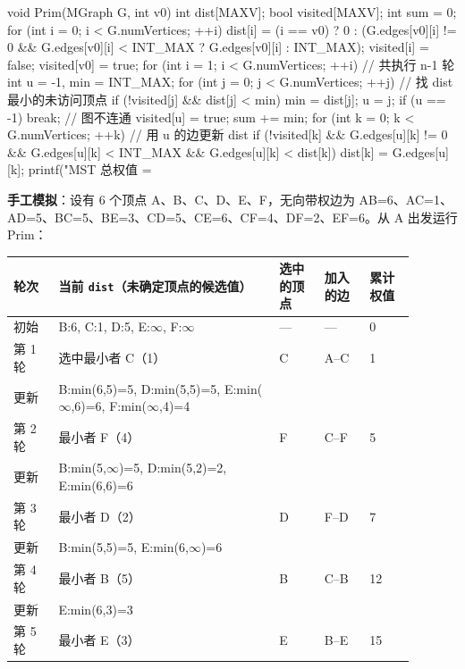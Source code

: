\documentclass[11pt,openany,UTF8]{ctexbook}
\begin{document}
\begin{codebox}
void Prim(MGraph G, int v0) {
    int dist[MAXV];
    bool visited[MAXV];
    int sum = 0;
    for (int i = 0; i < G.numVertices; ++i) {
        dist[i] = (i == v0) ? 0 :
                  (G.edges[v0][i] != 0 && G.edges[v0][i] < INT_MAX ? G.edges[v0][i] : INT_MAX);
        visited[i] = false;
    }
    visited[v0] = true;
    for (int i = 1; i < G.numVertices; ++i) {     // 共执行 n-1 轮
        int u = -1, min = INT_MAX;
        for (int j = 0; j < G.numVertices; ++j) { // 找 dist 最小的未访问顶点
            if (!visited[j] && dist[j] < min) { min = dist[j]; u = j; }
        }
        if (u == -1) break;                       // 图不连通
        visited[u] = true;
        sum += min;
        for (int k = 0; k < G.numVertices; ++k) { // 用 u 的边更新 dist
            if (!visited[k] && G.edges[u][k] != 0 && G.edges[u][k] < INT_MAX
                && G.edges[u][k] < dist[k])
                dist[k] = G.edges[u][k];
        }
    }
    printf("MST 总权值 = %
}
\end{codebox}

\textbf{手工模拟}：设有 6 个顶点 A、B、C、D、E、F，无向带权边为 AB=6、AC=1、AD=5、BC=5、BE=3、CD=5、CE=6、CF=4、DF=2、EF=6。从 A 出发运行 Prim：

\begingroup\small\setlength{\tabcolsep}{4.0pt}
\begin{longtable}{@{}L{0.1006\linewidth}L{0.4917\linewidth}L{0.1006\linewidth}L{0.1006\linewidth}L{0.1006\linewidth}@{}}
\toprule
\textbf{轮次} & \textbf{当前 \texttt{dist}（未确定顶点的候选值）} & \textbf{选中的顶点} & \textbf{加入的边} & \textbf{累计权值} \\
\midrule
\endhead
初始 & B:6, C:1, D:5, E:$\infty$, F:$\infty$ & — & — & 0 \\
第 1 轮 & 选中最小者 C（1） & C & A–C & 1 \\
更新 & B:min(6,5)=5, D:min(5,5)=5, E:min($\infty$,6)=6, F:min($\infty$,4)=4 &  &  &  \\
第 2 轮 & 最小者 F（4） & F & C–F & 5 \\
更新 & B:min(5,$\infty$)=5, D:min(5,2)=2, E:min(6,6)=6 &  &  &  \\
第 3 轮 & 最小者 D（2） & D & F–D & 7 \\
更新 & B:min(5,5)=5, E:min(6,$\infty$)=6 &  &  &  \\
第 4 轮 & 最小者 B（5） & B & C–B & 12 \\
更新 & E:min(6,3)=3 &  &  &  \\
第 5 轮 & 最小者 E（3） & E & B–E & 15 \\
\bottomrule
\end{longtable}
\endgroup
\end{document}
